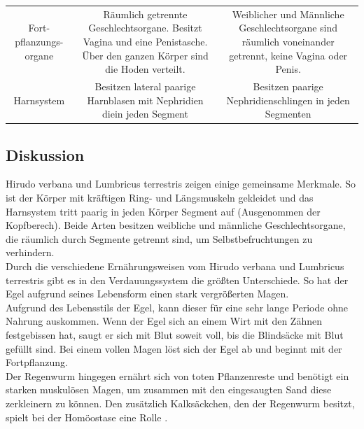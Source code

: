 \documentclass[oneside,10pt,a4paper]{report}
\begin{document}
\begin{table}[H]
\begin{tabular}{c c c}
						& &\\
						\midrule
						\multirow{4}{*}{\parbox[t]{2cm}{Fort- pflanzungs- organe}} & \multirow{4}{*}{\parbox[t]{6cm}{Räumlich getrennte Geschlechtsorgane. Besitzt Vagina und eine Penistasche. Über den ganzen Körper sind die Hoden verteilt.}}&\multirow{4}{*}{\parbox[t]{6cm}{Weiblicher und Männliche Geschlechtsorgane sind räumlich voneinander getrennt, keine Vagina oder Penis.}}\\
						& &\\
						&&\\
						&&\\
						\midrule
						\multirow{2}{*}{\parbox[t]{2cm}{Harnsystem}}& \multirow{2}{*}{\parbox[t]{6cm}{Besitzen lateral paarige  Harnblasen mit Nephridien diein jeden Segment}}&\multirow{2}{*}{\parbox[t]{6cm}{Besitzen paarige Nephridienschlingen in jeden Segmenten}}\\
						& &\\
						\bottomrule
					\end{tabular}
				\end{table}
				
			\subsection{Diskussion}
				Hirudo verbana und Lumbricus terrestris zeigen einige gemeinsame Merkmale. So ist der Körper mit kräftigen Ring- und Längsmuskeln gekleidet und das Harnsystem tritt paarig in jeden Körper Segment auf (Ausgenommen der Kopfberech). Beide Arten besitzen weibliche und männliche Geschlechtsorgane, die räumlich durch Segmente getrennt sind, um Selbstbefruchtungen zu verhindern.\\
				Durch die verschiedene Ernährungsweisen vom Hirudo verbana und Lumbricus terrestris gibt es in den Verdauungssystem die größten Unterschiede. So hat der Egel aufgrund seines Lebensform einen stark vergrößerten Magen.\\
				Aufgrund des Lebensstils der Egel, kann dieser für eine sehr lange Periode ohne Nahrung auskommen. Wenn der Egel sich an einem Wirt mit den Zähnen festgebissen hat, saugt er sich mit Blut soweit voll, bis die Blindsäcke mit Blut gefüllt sind. Bei einem vollen Magen löst sich der Egel ab und beginnt mit der Fortpflanzung.\\
				Der Regenwurm hingegen ernährt sich von toten Pflanzenreste und benötigt ein starken muskulösen Magen, um zusammen mit den eingesaugten Sand diese zerkleinern zu können. Den zusätzlich Kalksäckchen, den der Regenwurm besitzt, spielt bei der Homöostase eine Rolle \cite{Kühkental}. 
				
\end{document}
